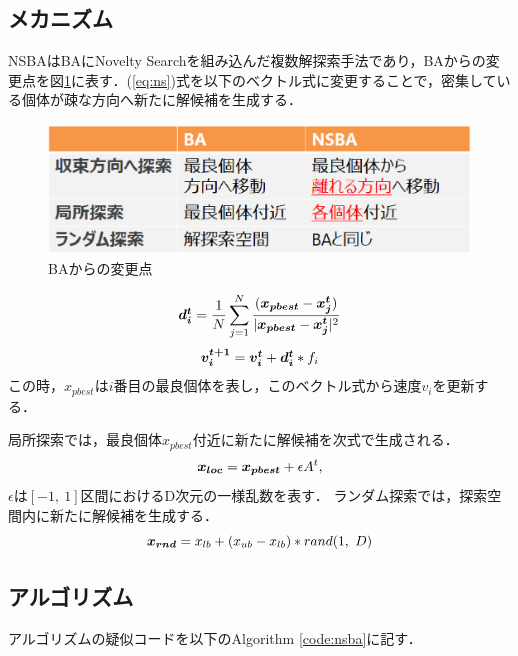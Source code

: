 \documentclass[a4j,11pt]{jarticle}
\begin{document}
\subsection{メカニズム}
\label{ss:NSBA-abst}
NSBAはBAにNovelty Searchを組み込んだ複数解探索手法であり，BAからの変更点を図\ref{fig:nsba_table}に表す．(\ref{eq:ns})式を以下のベクトル式に変更することで，密集している個体が疎な方向へ新たに解候補を生成する．

\begin{figure}
  \centering
  \includegraphics[width=0.7\linewidth]{eps/nsba_table.eps}
  \caption{BAからの変更点}
  \label{fig:nsba_table}
\end{figure}
\begin{equation}
\mbox{\boldmath $d_i^{t}$} = \frac {1}{N} \sum _{j=1}^N \frac {(\mbox{\boldmath $x_{pbest}$}-\mbox{\boldmath $x_j^{t}$})}{|\mbox{\boldmath $x_{pbest}$}-\mbox{\boldmath $x_j^{t}$}|^2}
\label{eq:nd*}
\end{equation}
\begin{equation}
\mbox{\boldmath $v_i^{t+1}$}=\mbox{\boldmath $v_i^{t}$}+\mbox{\boldmath $d_i^{t}$}*f_i
\label{eq:nsvi}
\end{equation}
この時，$x_{pbest}$は$i$番目の最良個体を表し，このベクトル式から速度$v_i$を更新する．

局所探索では，最良個体$x_{pbest}$付近に新たに解候補を次式で生成される．
\begin{equation}
\mbox{\boldmath $x_{loc}$}=\mbox{\boldmath $x_{pbest}$} + \epsilon A^t,
\label{eq:ns_xloc}
\end{equation}
$\epsilon$は$[-1, \ 1]$区間におけるD次元の一様乱数を表す．
ランダム探索では，探索空間内に新たに解候補を生成する．
\begin{equation}
\mbox{\boldmath $x_{rnd}$} = x_{lb} + (x_{ub} - x_{lb})* rand(1, \ D)
\label{eq:ns_rnd}
\end{equation}

\subsection{アルゴリズム}
\label{ss:NSBA-algorithm}
アルゴリズムの疑似コードを以下のAlgorithm \ref{code:nsba}に記す．
\end{document}
